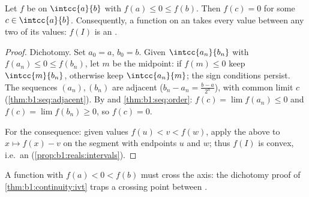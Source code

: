 \begin{theorem}\label{thm:b1:continuity:ivt}
Let $f$ be  on $\intcc{a}{b}$ with $f(a) \leq 0 \leq
f(b)$. Then $f(c) = 0$ for some $c \in \intcc{a}{b}$.
Consequently, a  function on an  takes every value
between any two of its values: $f(I)$ is an
.
\end{theorem}

\begin{proof}
Dichotomy. Set $a_0 = a$, $b_0 = b$. Given $\intcc{a_n}{b_n}$ with
$f(a_n) \leq 0 \leq f(b_n)$, let $m$ be the midpoint: if $f(m) \leq
0$ keep $\intcc{m}{b_n}$, otherwise keep $\intcc{a_n}{m}$; the sign
conditions persist. The sequences $(a_n), (b_n)$ are adjacent ($b_n -
a_n = \frac{b-a}{2^n}$), with common limit $c$
(\cref{thm:b1:seq:adjacent}). By  and
\cref{thm:b1:seq:order}: $f(c) = \lim f(a_n) \leq 0$ and $f(c) =
\lim f(b_n) \geq 0$, so $f(c) = 0$.

For the consequence: given values $f(u) < v < f(w)$, apply the above
to $x \mapsto f(x) - v$ on the segment with endpoints $u$ and $w$;
thus $f(I)$ is convex, i.e.\ an 
(\cref{prop:b1:reals:intervals}).
\end{proof}

\begin{omfigure}

{\small A  function with $f(a) < 0 < f(b)$ must cross the
axis: the dichotomy proof of \cref{thm:b1:continuity:ivt} traps a
crossing point between .}
\end{omfigure}

